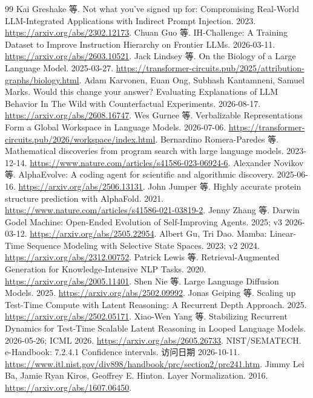 \begin{thebibliography}{99}
 Kai Greshake 等. Not what you've signed up for: Compromising Real-World LLM-Integrated Applications with Indirect Prompt Injection. 2023. \url{https://arxiv.org/abs/2302.12173}.
 Chuan Guo 等. IH-Challenge: A Training Dataset to Improve Instruction Hierarchy on Frontier LLMs. 2026-03-11. \url{https://arxiv.org/abs/2603.10521}.
 Jack Lindsey 等. On the Biology of a Large Language Model. 2025-03-27. \url{https://transformer-circuits.pub/2025/attribution-graphs/biology.html}.
 Adam Karvonen, Euan Ong, Subhash Kantamneni, Samuel Marks. Would this change your answer? Evaluating Explanations of LLM Behavior In The Wild with Counterfactual Experiments. 2026-08-17. \url{https://arxiv.org/abs/2608.16747}.
 Wes Gurnee 等. Verbalizable Representations Form a Global Workspace in Language Models. 2026-07-06. \url{https://transformer-circuits.pub/2026/workspace/index.html}.
 Bernardino Romera-Paredes 等. Mathematical discoveries from program search with large language models. 2023-12-14. \url{https://www.nature.com/articles/s41586-023-06924-6}.
 Alexander Novikov 等. AlphaEvolve: A coding agent for scientific and algorithmic discovery. 2025-06-16. \url{https://arxiv.org/abs/2506.13131}.
 John Jumper 等. Highly accurate protein structure prediction with AlphaFold. 2021. \url{https://www.nature.com/articles/s41586-021-03819-2}.
 Jenny Zhang 等. Darwin Godel Machine: Open-Ended Evolution of Self-Improving Agents. 2025; v3 2026-03-12. \url{https://arxiv.org/abs/2505.22954}.
 Albert Gu, Tri Dao. Mamba: Linear-Time Sequence Modeling with Selective State Spaces. 2023; v2 2024. \url{https://arxiv.org/abs/2312.00752}.
 Patrick Lewis 等. Retrieval-Augmented Generation for Knowledge-Intensive NLP Tasks. 2020. \url{https://arxiv.org/abs/2005.11401}.
 Shen Nie 等. Large Language Diffusion Models. 2025. \url{https://arxiv.org/abs/2502.09992}.
 Jonas Geiping 等. Scaling up Test-Time Compute with Latent Reasoning: A Recurrent Depth Approach. 2025. \url{https://arxiv.org/abs/2502.05171}.
 Xiao-Wen Yang 等. Stabilizing Recurrent Dynamics for Test-Time Scalable Latent Reasoning in Looped Language Models. 2026-05-26; ICML 2026. \url{https://arxiv.org/abs/2605.26733}.
 NIST/SEMATECH. e-Handbook: 7.2.4.1 Confidence intervals. 访问日期 2026-10-11. \url{https://www.itl.nist.gov/div898/handbook/prc/section2/prc241.htm}.
 Jimmy Lei Ba, Jamie Ryan Kiros, Geoffrey E. Hinton. Layer Normalization. 2016. \url{https://arxiv.org/abs/1607.06450}.

\end{thebibliography}
